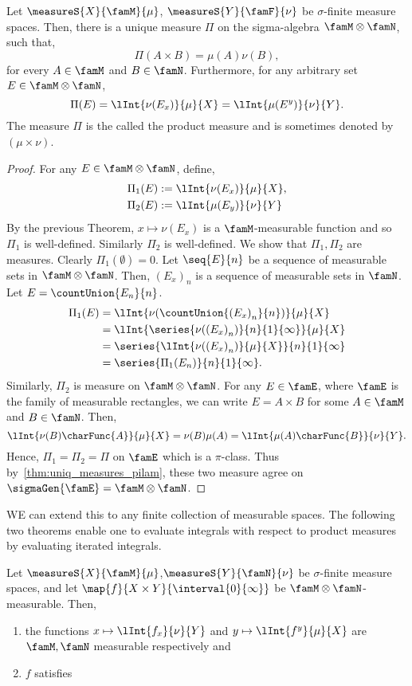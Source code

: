 \begin{Theorem}
    Let $\measureS{X}{\famM}{\mu}$, $\measureS{Y}{\famF}{\nu}$ be $\sigma$-finite measure spaces. Then, there
    is a unique measure $\Pi$ on the sigma-algebra $\famM\otimes\famN$, such that,
    \[\Pi(A\times B) = \mu(A)\nu(B),\]
    for every $A \in \famM$ and $B \in \famN$. Furthermore, for any arbitrary set $E \in \famM\otimes\famN$,
    \[\Pi(E) = \lInt{\nu(E_x)}{\mu}{X} = \lInt{\mu(E^{y})}{\nu}{Y}.\]
    The measure $\Pi$ is the called the product measure and is sometimes denoted by $(\mu\times \nu)$.
\end{Theorem}
\begin{proof}
    For any $E \in \famM\otimes\famN$, define, 
    \begin{align*}
	\Pi_{1}(E) &:= \lInt{\nu(E_x)}{\mu}{X},\\ 
	\Pi_{2}(E) &:= \lInt{\mu(E_y)}{\nu}{Y}
    \end{align*}
    By the previous Theorem, $x\mapsto\nu(E_x)$ is a $\famM$-measurable function and so $\Pi_{1}$ is
    well-defined. Similarly $\Pi_2$ is well-defined.
    We show that $\Pi_{1},\Pi_{2}$ are measures.
    Clearly $\Pi_{1}(\emptyset) = 0$. Let $\seq{E}{n}$ be a sequence of measurable sets in
    $\famM\otimes\famN$. Then, ${(E_x)}_n$ is a sequence of measurable sets in $\famN$. Let $E =
    \countUnion{E_n}{n}$.
    \begin{align*}
	\Pi_{1}(E) &= \lInt{\nu(\countUnion{{(E_x)}_n}{n})}{\mu}{X}\\ 
	&= \lInt{\series{\nu({(E_x)}_n)}{n}{1}{\infty}}{\mu}{X}\\
	&= \series{\lInt{\nu({(E_x)}_n)}{\mu}{X}}{n}{1}{\infty}\\
	&= \series{\Pi_{1}(E_n)}{n}{1}{\infty}.
    \end{align*}
    Similarly, $\Pi_{2}$ is measure on $\famM\otimes\famN$.
    For any $E \in \famE$, where $\famE$ is the family of measurable rectangles, we can write $E = A \times B$
    for some $A \in \famM$ and $B \in \famN$. Then,
    \[\lInt{\nu(B)\charFunc{A}}{\mu}{X} = \nu(B)\mu(A) = \lInt{\mu(A)\charFunc{B}}{\nu}{Y}.\]
    Hence,
    $\Pi_1 = \Pi_2 = \Pi$ on $\famE$ which is a $\pi$-class. Thus by~\ref{thm:uniq_measures_pilam}, these two
    measure agree on $\sigmaGen{\famE} = \famM\otimes\famN$.
\end{proof}
WE can extend this to any finite collection of measurable spaces.
The following two theorems enable one to evaluate integrals with respect to product measures by evaluating
iterated integrals.
\begin{Proposition}[name=Tonelli's Theorem]\label{prop:tonelli_thm}
    Let $\measureS{X}{\famM}{\mu}$,$\measureS{Y}{\famN}{\nu}$ be $\sigma$-finite measure spaces, and let
    $\map{f}{X\times Y}{\interval{0}{\infty}}$ be $\famM\otimes\famN$-measurable. Then,
    \begin{enumerate}
	\item
	    the functions $x\mapsto\lInt{f_x}{\nu}{Y}$ and $y\mapsto\lInt{f^{y}}{\mu}{X}$ are $\famM,\famN$
	    measurable respectively and
	\item
	    $f$ satisfies
    \end{enumerate}
\end{Proposition}
